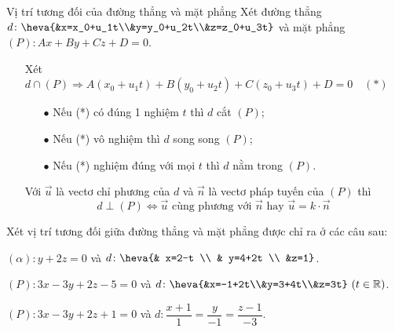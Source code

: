 \begin{dang}{Vị trí tương đối của đường thẳng và mặt phẳng}
	Xét đường thẳng $d \colon \heva{&x=x_0+u_1t\\&y=y_0+u_2t\\&z=z_0+u_3t}$ và mặt phẳng $(P) \colon Ax + By + Cz + D =0$.
	\begin{itemize}
		\item [\iconMT]  Xét $d \cap (P) \Rightarrow A(x_0+u_1t)+B(y_0+u_2t)+C(z_0+u_3t)+D=0 \quad (*)$
		\begin{boxdn}
			\begin{itemize}
				\item [$\bullet$] Nếu (*) có đúng 1 nghiệm $t$ thì $d$ cắt $(P)$;
				\item [$\bullet$] Nếu (*) vô nghiệm  thì $d$ song song $(P)$;
				\item [$\bullet$] Nếu (*) nghiệm đúng với mọi $t$ thì $d$ nằm trong $(P)$.
			\end{itemize}
		\end{boxdn}
		\item [\iconMT]  Với $\vec{u}$ là vectơ chỉ phương của $d$ và $\vec{n}$ là vectơ pháp tuyến của $(P)$ thì
		$$d \perp (P) \Leftrightarrow \vec{u} \text{ cùng phương với } \vec{n} \text{ hay } \vec{u}=k \cdot\vec{n}$$
	\end{itemize}
\end{dang}
\viduminhhoa
\setcounter{vd}{0}

\begin{vd}
	Xét vị trí tương đối giữa đường thẳng và mặt phẳng được chỉ ra ở các câu sau:
	\begin{enumEX}[a)]{1}
		\item $(\alpha) \colon y+2z=0$ và $d \colon \heva{& x=2-t \\ & y=4+2t \\ &z=1} $.
		\item $(P)\colon3x-3y+2z-5=0$ và $d\colon\heva{&x=-1+2t\\&y=3+4t\\&z=3t}~(t\in\mathbb{R})$.
		\item $(P)\colon 3x-3y+2z+1=0$ và $d\colon \dfrac{x+1}{1}=\dfrac{y}{-1}=\dfrac{z-1}{-3}$.
	\end{enumEX}
\end{vd}

